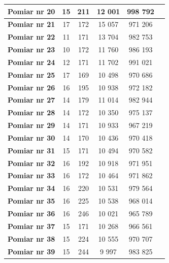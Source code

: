 \documentclass[11pt,a4paper]{article}
\begin{document}
\begin{table}[htbp]
\begin{center}
\begin{tabular}{|c|c|c|c|c|c|}
\textbf{Pomiar nr 20} & 15 & 211 & 12 001 & 998 792 &  \\ \hline
\textbf{Pomiar nr 21} & 17 & 172 & 15 057 & 971 206 &  \\ \hline
\textbf{Pomiar nr 22} & 11 & 171 & 13 704 & 982 753 &  \\ \hline
\textbf{Pomiar nr 23} & 10 & 172 & 11 760 & 986 193 &  \\ \hline
\textbf{Pomiar nr 24} & 12 & 171 & 11 702 & 991 021 &  \\ \hline
\textbf{Pomiar nr 25} & 17 & 169 & 10 498 & 970 686 &  \\ \hline
\textbf{Pomiar nr 26} & 16 & 195 & 10 938 & 972 182 &  \\ \hline
\textbf{Pomiar nr 27} & 14 & 179 & 11 014 & 982 944 &  \\ \hline
\textbf{Pomiar nr 28} & 14 & 172 & 10 350 & 975 137 &  \\ \hline
\textbf{Pomiar nr 29} & 14 & 171 & 10 933 & 967 219 &  \\ \hline
\textbf{Pomiar nr 30} & 14 & 170 & 10 436 & 970 418 &  \\ \hline
\textbf{Pomiar nr 31} & 15 & 171 & 10 494 & 970 582 &  \\ \hline
\textbf{Pomiar nr 32} & 16 & 192 & 10 918 & 971 951 &  \\ \hline
\textbf{Pomiar nr 33} & 16 & 172 & 10 464 & 971 862 &  \\ \hline
\textbf{Pomiar nr 34} & 16 & 220 & 10 531 & 979 564 &  \\ \hline
\textbf{Pomiar nr 35} & 16 & 225 & 10 538 & 968 014 &  \\ \hline
\textbf{Pomiar nr 36} & 16 & 246 & 10 021 & 965 789 &  \\ \hline
\textbf{Pomiar nr 37} & 15 & 171 & 10 268 & 966 561 &  \\ \hline
\textbf{Pomiar nr 38} & 15 & 224 & 10 555 & 970 707 &  \\ \hline
\textbf{Pomiar nr 39} & 15 & 244 & 9 997 & 983 825 &  \\ \hline
\end{tabular}
\end{center}
\label{dfs1}
\end{table}

\newpage
\end{document}
